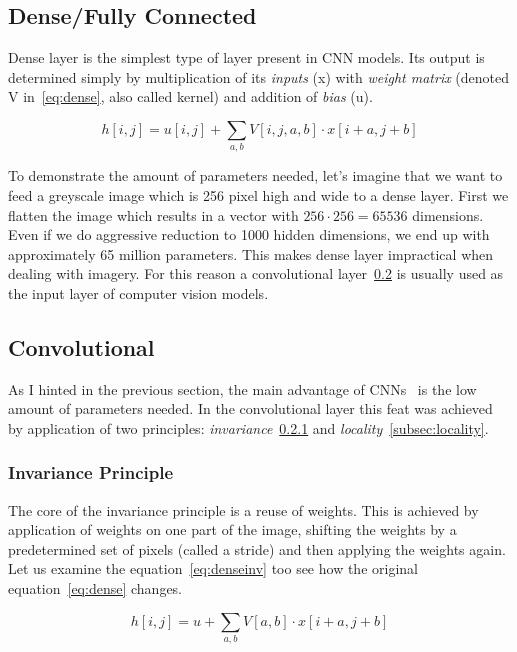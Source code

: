 \subsection{Dense/Fully Connected}\label{subsec:dense}
Dense layer is the simplest type of layer present in CNN models.
Its output is determined simply by multiplication of its \textit{inputs} (x) with \textit{weight matrix}
(denoted V in~\ref{eq:dense}, also called kernel) and addition of \textit{bias} (u).

\begin{equation}
    \label{eq:dense}
    h[i, j] = u[i,j] + \sum_{a,b} V[i,j,a,b] \cdot x[i+a,j+b]
\end{equation}

To demonstrate the amount of parameters needed, let's imagine that we want to feed a greyscale image which is 256 pixel
high and wide to a dense layer.
First we flatten the image which results in a vector with $256\cdot256 = 65536$ dimensions.
Even if we do aggressive reduction to 1000 hidden dimensions, we end up with approximately 65 million parameters.
This makes dense layer impractical when dealing with imagery.
For this reason a convolutional layer~\ref{subsec:convolutional} is usually used as the input layer of computer
vision models.

\subsection{Convolutional}\label{subsec:convolutional}
As I hinted in the previous section, the main advantage of CNNs~\cite{ConvLayer} is the low amount of parameters needed.
In the convolutional layer this feat was achieved by application of two principles:
\textit{invariance}~\ref{subsec:invariance} and \textit{locality}~\ref{subsec:locality}.

\subsubsection{Invariance Principle}\label{subsec:invariance}
The core of the invariance principle is a reuse of weights.
This is achieved by application of weights on one part of the image, shifting the weights by a predetermined set
of pixels (called a stride) and then applying the weights again.
Let us examine the equation~\ref{eq:denseinv} too see how the original equation~\ref{eq:dense} changes.

\begin{equation}
    \label{eq:denseinv}
    h[i, j] = u + \sum_{a,b} V[a,b] \cdot x[i+a,j+b]
\end{equation}

